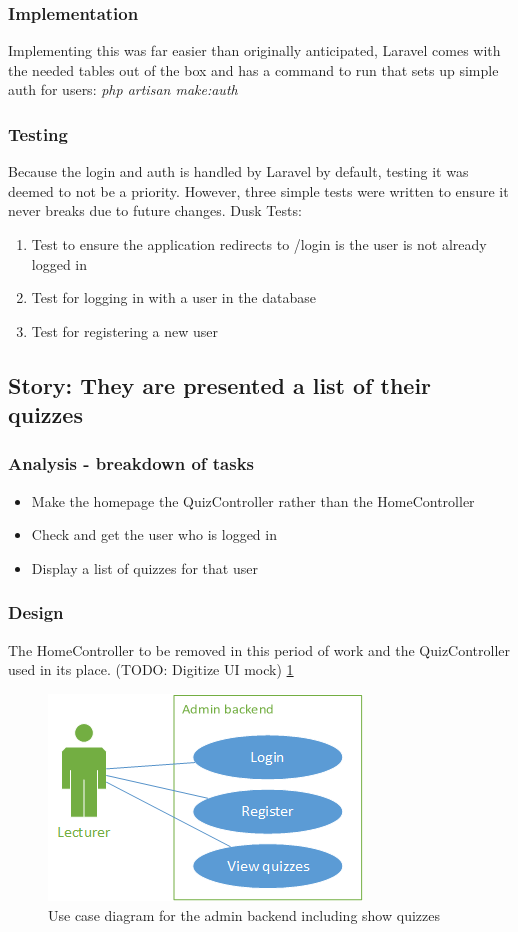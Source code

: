 \subsubsection{Implementation}
Implementing this was far easier than originally anticipated, Laravel comes with the needed tables out of the box and has a command to run that sets up simple auth for users: \textit{php artisan make:auth} 
\subsubsection{Testing}
Because the login and auth is handled by Laravel by default, testing it was deemed to not be a priority. However, three simple tests were written to ensure it never breaks due to future changes. Dusk Tests:
\begin{enumerate}
	\item Test to ensure the application redirects to /login is the user is not already logged in
	\item Test for logging in with a user in the database
	\item Test for registering a new user
\end{enumerate}
\newpage

\subsection{Story: They are presented a list of their quizzes}
\subsubsection{Analysis - breakdown of tasks}
\begin{itemize}
	\item Make the homepage the QuizController rather than the HomeController
	\item Check and get the user who is logged in
	\item Display a list of quizzes for that user
\end{itemize}
\subsubsection{Design}
The HomeController to be removed in this period of work and the QuizController used in its place. (TODO: Digitize UI mock) \ref{fig:quiz-list-use-case}

\begin{figure}
	\caption{Use case diagram for the admin backend including show quizzes}
	\centerline{\includegraphics{Chapter2/Iter-1/iter-1-use-case-v2}}
	\label{fig:quiz-list-use-case}
\end{figure}

